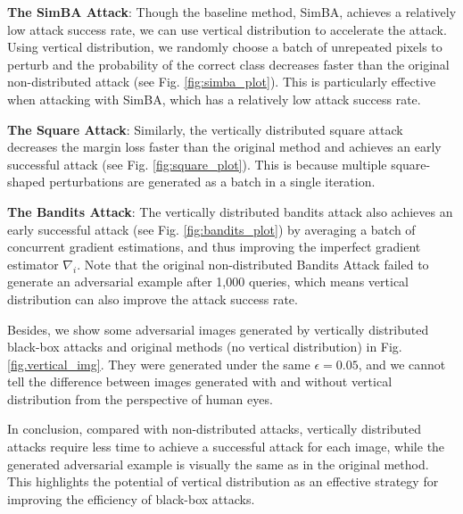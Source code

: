 \textbf{The SimBA Attack}: Though the baseline method, SimBA, achieves a relatively low attack success rate, we can use vertical distribution to accelerate the attack. Using vertical distribution, we randomly choose a batch of unrepeated pixels to perturb and the probability of the correct class decreases faster than the original non-distributed attack (see Fig. \ref{fig:simba_plot}). This is particularly effective when attacking with SimBA, which has a relatively low attack success rate. 


\textbf{The Square Attack}: Similarly, the vertically distributed square attack decreases the margin loss faster than the original method and achieves an early successful attack (see Fig. \ref{fig:square_plot}). This is because multiple square-shaped perturbations are generated as a batch in a single iteration.

\textbf{The Bandits Attack}: The vertically distributed bandits attack also achieves an early successful attack (see Fig. \ref{fig:bandits_plot}) by averaging a batch of concurrent gradient estimations, and thus improving the imperfect gradient estimator $\nabla_i$. Note that the original non-distributed Bandits Attack failed to generate an adversarial example after 1,000 queries, which means vertical distribution can also improve the attack success rate.

Besides, we show some adversarial images generated by vertically distributed black-box attacks and original methods (no vertical distribution) in Fig. \ref{fig.vertical_img}. They were generated under the same $\epsilon=0.05$, and we cannot tell the difference between images generated with and without vertical distribution from the perspective of human eyes.

In conclusion, compared with non-distributed attacks, vertically distributed attacks require less time to achieve a successful attack for each image, while the generated adversarial example is visually the same as in the original method. This highlights the potential of vertical distribution as an effective strategy for improving the efficiency of black-box attacks.


